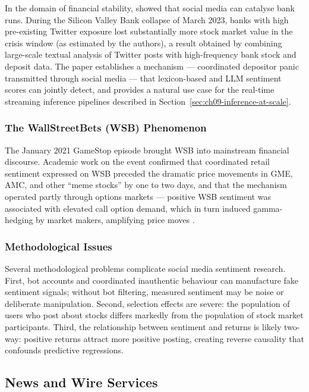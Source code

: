 In the domain of financial stability, \citet{cookson2026bankrun} showed that social media can catalyse bank runs. During the Silicon Valley Bank collapse of March 2023, banks with high pre-existing Twitter exposure lost substantially more stock market value in the crisis window (as estimated by the authors), a result obtained by combining large-scale textual analysis of Twitter posts with high-frequency bank stock and deposit data. The paper establishes a mechanism --- coordinated depositor panic transmitted through social media --- that lexicon-based and LLM sentiment scores can jointly detect, and provides a natural use case for the real-time streaming inference pipelines described in Section~\ref{sec:ch09-inference-at-scale}.

\subsubsection*{The WallStreetBets (WSB) Phenomenon}

The January 2021 GameStop episode brought WSB into mainstream financial discourse. Academic work on the event confirmed that coordinated retail sentiment expressed on WSB preceded the dramatic price movements in GME, AMC, and other ``meme stocks'' by one to two days, and that the mechanism operated partly through options markets --- positive WSB sentiment was associated with elevated call option demand, which in turn induced gamma-hedging by market makers, amplifying price moves \citep{chen2022wsb}.

\subsubsection*{Methodological Issues}

Several methodological problems complicate social media sentiment research. First, bot accounts and coordinated inauthentic behaviour can manufacture fake sentiment signals; without bot filtering, measured sentiment may be noise or deliberate manipulation. Second, selection effects are severe: the population of users who post about stocks differs markedly from the population of stock market participants. Third, the relationship between sentiment and returns is likely two-way: positive returns attract more positive posting, creating reverse causality that confounds predictive regressions.

\subsection{News and Wire Services}
\label{sec:ch09-news-wire-services}

